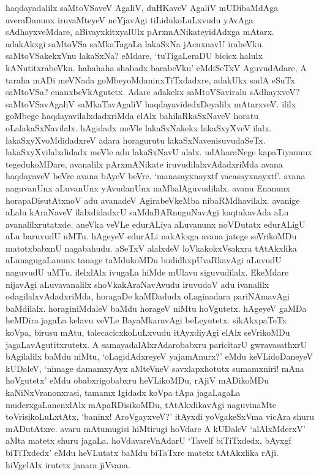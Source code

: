 haqdayadalilx saMtoVSaveV AgaliV, duHKaveV AgaliV mUDibaMdAga averaDanunx iruvaMteyeV neYjavAgi tiLidukoLuLxvudu yAvAga sAdhayxveMdare, aBivayxkitxyalUlx pArxmANikateyidAdxga mAtarx. adakAkxgi saMtoVSa saMkaTagaLa lakaSxNa jAcnxnavU irabeVku. saMtoVSakekxVnu lakaSxNa? eMdare, `tuTigaLeraDU bicicx halulx kANutitxrabeVku. hahahaha shabadx barabeVku' eMdiSeTxV AguvudAdare, A taraha mADi meVNada goMbeyoMdaninxTiTxdadxre, adakUkx sadA eSuTx saMtoVSa? enanxbeVkAgutetx. Adare adakekx saMtoVSaviralu sAdhayxveV? saMtoVSavAgaliV saMkaTavAgaliV haqdayavidedxDeyalilx mAtarxveV. ililx goMbege haqdayavilalxdadxriMda elAlx bahilaRkaSxNaveV horatu oLalakaSxNavilalx. hAgidadx meVle lakaSxNakekx lakaSxyXveV ilalx. lakaSxyXvoMdidadxreV adara horagurutu lakaSxNavenisuvudaSeTx. lakaSxyXvilalxdidadx meVle adu lakaSxNavU alalx. udAharaNege kapaTiyanunx tegedukoMDare, avanalilx pArxmANikate iruvudilalxvAdadxriMda avana haqdayaveV beVre avana bAyeV beVre. `manasayxnayxtf vacasayxnayxtf'.\label{102} avana naguvanUnx aLuvanUnx yAvudanUnx naMbalAguvudilalx. avanu Enanunx  horapaDisutAtxnoV adu avanadeV AgirabeVkeMba nibaRMdhavilalx. avanige aLalu kAraNaveV ilalxdidadxrU saMdaBARnuguNavAgi kaqtakavAda aLu avanalilxrutatxde. aneVka veVLe edurALiya aLuvanunx noVDutatx edurALigU aLu baruvudU uMTu. hAgeyeV edurALi nakAkxga avana jatege seVrikoMDu matotxbabxnU nagabahudu. aSeTxV alalxdeV loVkakokxVsakxra tAtAkxlika aLunagugaLanunx tanage taMdukoMDu budidhxpUvaRkavAgi aLuvudU naguvudU uMTu. ilelxlAlx ivugaLa hiMde mUlavu siguvudilalx. EkeMdare nijavAgi aLuvavanalilx shoVkakAraNavAvudu iruvudoV adu ivanalilx odagilalxvAdadxriMda, horagaDe kaMDadudx oLaginadara pariNAmavAgi baMdilalx. horaginiMdaleV baMdu horageV niMtu hoVgutetx. hAgeyeV gaMDa heMDira jagaLa kelavu veVLe BayaMkaravAgi beLeyutetx. sikAkxpaTeTx koVpa, birusu mAtu, talecacicxkoLuLxvudu itAyxdiyAgi elAlx seVrikoMDu jagaLavAgutitxrutetx. A samayadalAlxrAdarobabxru paricitarU gwravasathxrU bAgilalilx baMdu niMtu, `oLagidAdxreyeV yajamAnurx?' eMdu keVLidoDaneyeV kUDaleV, `nimage damamxyAyx aMteVneV savxlapxhotutx sumamxniri! mAna hoVgutetx' eMdu obabxrigobabxru heVLikoMDu, rAjiV mADikoMDu kaNiNxVranonxrasi, tamamx Igidadx koVpa tApa jagaLagaLa muderxgaLanenxlAlx mApaRDisikoMDu, tAtAkxlikavAgi naguvinaMte toVrisikoLuLxtAtx, `baninx! AroVgayxveV?' itAyxdi yoVgakeSxVma vicAra shuru mADutAtxre. avaru mAtumugisi hiMtirugi hoVdare A kUDaleV `alAlxMderxV' aMta matetx shuru jagaLa. hoVdavareVnAdarU `Tavelf biTiTxdedx, bAyxgf biTiTxdedx' eMdu heVLutatx baMdu biTaTxre matetx tAtAkxlika rAji. hiVgelAlx irutetx janara jiVvana.


